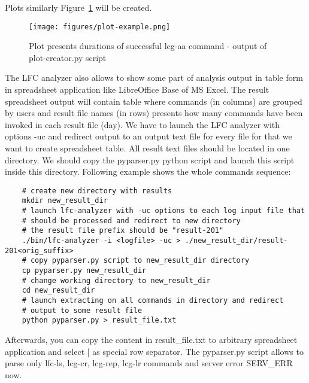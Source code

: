 \documentclass[a4paper, 11pt]{article} %
\begin{document}
Plots similarly Figure~\ref{img:plot-example} will be created.

\begin{figure}[H]
  \centering
    \texttt{[image: figures/plot-example.png]}
    \caption{Plot presents durations of successful lcg-aa command - output of plot-creator.py script}
    \label{img:plot-example}
\end{figure}

The LFC analyzer also allows to show some part of analysis output in table form in spreadsheet application like 
LibreOffice Base of MS Excel. The result spreadsheet output will contain table where commands (in columns) are grouped
by users and result file names (in rows) presents how many commands have been invoked in each result file (day).
We have to launch the LFC analyzer with options -uc and redirect output to an output text file for every file for that
we want to create spreadsheet table. All result text files should be located in one directory. We should copy the 
pyparser.py python script and launch this script inside this directory. Following example shows the whole commands sequence:

\begin{verbatim}
    # create new directory with results
    mkdir new_result_dir
    # launch lfc-analyzer with -uc options to each log input file that 
    # should be processed and redirect to new directory
    # the result file prefix should be "result-201"
    ./bin/lfc-analyzer -i <logfile> -uc > ./new_result_dir/result-201<orig_suffix>
    # copy pyparser.py script to new_result_dir directory
    cp pyparser.py new_result_dir 
    # change working directory to new_result_dir
    cd new_result_dir
    # launch extracting on all commands in directory and redirect 
    # output to some result file
    python pyparser.py > result_file.txt
\end{verbatim}

Afterwards, you can copy the content in result\_file.txt to arbitrary spreadsheet application and select | as 
special row separator. The pyparser.py script allows to parse only lfc-ls, lcg-cr, lcg-rep, lcg-lr commands and server 
error SERV\_ERR now.






\end{document}
